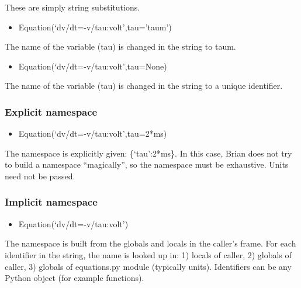 \documentclass[letterpaper,10pt,english]{manual}
\begin{document}
These are simply string substitutions.
\begin{itemize}
\item {} 
Equation(`dv/dt=-v/tau:volt',tau='taum')

\end{itemize}

The name of the variable (tau) is changed in the string to taum.
\begin{itemize}
\item {} 
Equation(`dv/dt=-v/tau:volt',tau=None)

\end{itemize}

The name of the variable (tau) is changed in the string to a unique identifier.


\subsubsection{Explicit namespace}
\begin{itemize}
\item {} 
Equation(`dv/dt=-v/tau:volt',tau=2*ms)

\end{itemize}

The namespace is explicitly given: \{`tau':2*ms\}. In this case, Brian does not try
to build a namespace ``magically'', so the namespace must be exhaustive.
Units need not be passed.


\subsubsection{Implicit namespace}
\begin{itemize}
\item {} 
Equation(`dv/dt=-v/tau:volt')

\end{itemize}

The namespace is built from the globals and locals in the caller's frame.
For each identifier in the string, the name is looked up in:
1) locals of caller,
2) globals of caller,
3) globals of equations.py module (typically units).
Identifiers can be any Python object (for example functions).
\end{document}
